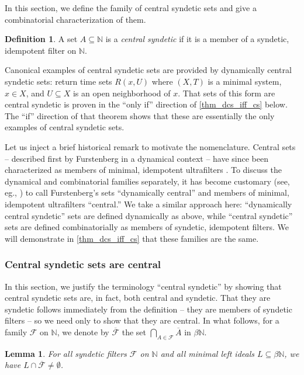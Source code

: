 \documentclass[letter,11pt]{article}
\theoremstyle{plain}
\newtheorem{lemma}[theorem]{Lemma}
\theoremstyle{definition}
\newtheorem{definition}[theorem]{Definition}
\theoremstyle{plain}
\theoremstyle{plain}
\numberwithin{equation}{section}
\newcommand{\N}{\mathbb{N}}
\newcommand{\filter}{\mathscr{F}}
\newcommand{\family}{\mathscr{F}}
\begin{document}
In this section, we define the family of central syndetic sets and give a combinatorial characterization of them.


\begin{definition}
\label{def_central_syndetic}
    A set $A \subseteq \N$ is a \emph{central syndetic} if it is a member of a syndetic, idempotent filter on $\N$.
\end{definition}

Canonical examples of central syndetic sets are provided by dynamically central syndetic sets: return time sets $R(x,U)$ where $(X,T)$ is a minimal system, $x \in X$, and $U \subseteq X$ is an open neighborhood of $x$.  That sets of this form are central syndetic is proven in the ``only if'' direction of \cref{thm_dcs_iff_cs} below.  The ``if'' direction of that theorem shows that these are essentially the only examples of central syndetic sets.

Let us inject a brief historical remark to motivate the nomenclature. Central sets -- described first by Furstenberg  \cite[Def. 8.3]{furstenberg_book_1981} in a dynamical context -- have since been characterized as members of minimal, idempotent ultrafilters \cite{glasner_1980,bergelson_hindman_1990,shi_yang_1996}. To discuss the dynamical and combinatorial families separately, it has become customary (see, eg., \cite[Sec. 19.3]{hindman_strauss_book_2012}) to call Furstenberg's sets ``dynamically central'' and members of minimal, idempotent ultrafilters ``central.''  We take a similar approach here: ``dynamically central syndetic'' sets are defined dynamically as above, while ``central syndetic'' sets are defined combinatorially as members of syndetic, idempotent filters.  We will demonstrate in \cref{thm_dcs_iff_cs} that these families are the same.


\subsubsection{Central syndetic sets are central}

In this section, we justify the terminology ``central syndetic'' by showing that central syndetic sets are, in fact, both central and syndetic.  That they are syndetic follows immediately from the definition -- they are members of syndetic filters -- so we need only to show that they are central. In what follows, for a family $\family$ on $\N$, we denote by $\overline{\family}$ the set $\bigcap_{A \in \family} \overline{A}$ in $\beta \N$.

\begin{lemma}
\label{lemma_syndetic_contained_in_minimal}
    For all syndetic filters $\filter$ on $\N$ and all minimal left ideals $L \subseteq \beta \N$, we have $L \cap \overline{\filter} \neq \emptyset$.
\end{lemma}
\end{document}
